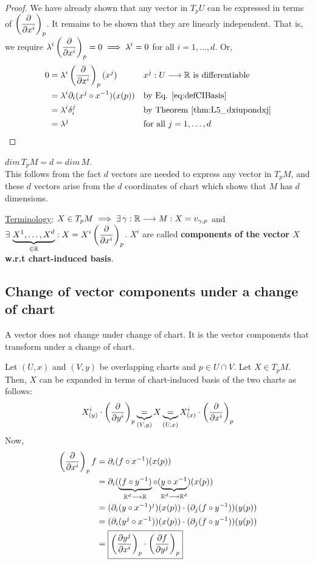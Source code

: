 \begin{proof} We have already shown that any vector in $T_pU$ can be expressed in terms of $\displaystyle\left(\cibasis{x^i}\right)_p$. It remains to be shown that they are linearly independent. That is, we require $\displaystyle\lambda^i \left(\cibasis{x^i}\right)_p = 0 \implies \lambda^i = 0$ for all $i = 1, \dotsc, d$. Or,
\begin{align*}
0 & = \lambda^i \left(\cibasis{x^i}\right)_p(x^j) && x^j : U \to \R \text{ is differentiable}\\
& = \lambda^i \partial_i (x^j \after x^{-1})(x(p)) && \text{by Eq. \ref{eq:defCIBasis}} \\
& = \lambda^i \delta^j_i && \text{by Theorem \ref{thm:L5_dxiupondxj}} \\
& = \lambda^j && \text{for all } j = 1, \dotsc, d 
\end{align*}
\end{proof}

\begin{corollary}
$dim \, T_pM = d = dim \, M$. \\
This follows from the fact $d$ vectors are needed to express any vector in $T_pM$, and these $d$ vectors arise from the $d$ coordinates of chart which shows that $M$ has $d$ dimensions.
\end{corollary}

\underline{Terminology}: $X \in T_pM \implies \exists \, \gamma : \R \to M : X = v_{\gamma,p}$ and $\displaystyle \exists \, \underbrace{X^1, \dotsc, X^d}_{\in \R} : X = X^i \left(\cibasis{x^i}\right)_p$. $X^i$ are called \textbf{components of the vector $X$ w.r.t chart-induced basis}.

\subsection{Change of vector components under a change of chart}
 A vector does not change under change of chart. It is the vector components that transform under a change of chart.

Let $(U,x)$ and $(V,y)$ be overlapping charts and $p \in U \cap V$. Let $X \in T_pM$. Then, $X$ can be expanded in terms of chart-induced basis of the two charts as follows:
\begin{equation}\label{eq:L5_VecExpandedIn2Charts}
X^i_{(y)} \cdot \left(\cibasis{y^i}\right)_p \underbrace{=}_{(V,y)} X \underbrace{=}_{(U,x)} X^i_{(x)} \cdot \left(\cibasis{x^i}\right)_p
\end{equation}
Now,
\begin{align*}
  \left(\cibasis{x^i}\right)_p f & = \partial_i(f \after x^{-1})(x(p)) \\
  & = \partial_i (\underbrace{(f \after y^{-1})}_{\R^d \to \R} \after (\underbrace{y \after x^{-1}}_{\R^d \to \R^d})(x(p)) \\
  & = (\partial_i (y \after x^{-1})^j)(x(p)) \cdot (\partial_j (f \after y^{-1}))(y(p)) \\
  & = (\partial_i (y^j \after x^{-1}))(x(p)) \cdot (\partial_j (f \after y^{-1}))(y(p)) \\
  & = \boxed{\left(\cibasis[y^j]{x^i}\right)_p \cdot \left(\cibasis[f]{y^j}\right)_p}
\end{align*}

